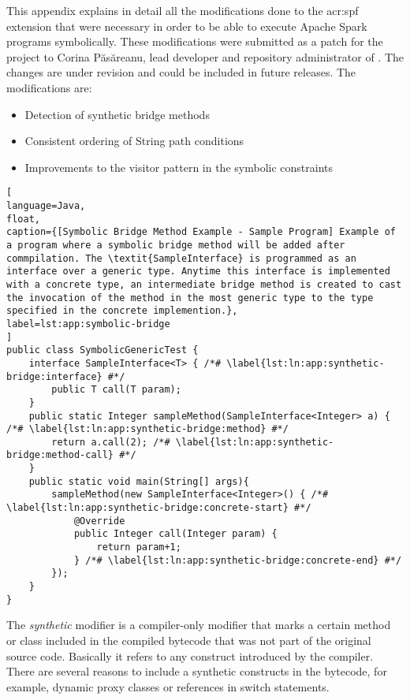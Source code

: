 \label{app:collaborations}

This appendix explains in detail all the modifications done to the \acrfull{acr:spf} extension that were necessary in order to be able to execute Apache Spark programs symbolically. These modifications were submitted as a patch for the \spf{} project to Corina Păsăreanu, lead developer and repository administrator of \spf{}. The changes are under revision and could be included in future releases. The modifications are:

\begin{itemize}
	\item Detection of synthetic bridge methods
	\item Consistent ordering of String path conditions
	\item Improvements to the visitor pattern in the symbolic constraints
\end{itemize}


\begin{lstlisting}[
language=Java,
float,
caption={[Symbolic Bridge Method Example - Sample Program] Example of a program where a symbolic bridge method will be added after commpilation. The \textit{SampleInterface} is programmed as an interface over a generic type. Anytime this interface is implemented with a concrete type, an intermediate bridge method is created to cast the invocation of the method in the most generic type to the type specified in the concrete implemention.},
label=lst:app:symbolic-bridge
]
public class SymbolicGenericTest {
	interface SampleInterface<T> { /*# \label{lst:ln:app:synthetic-bridge:interface} #*/
		public T call(T param); 
	}
	public static Integer sampleMethod(SampleInterface<Integer> a) { /*# \label{lst:ln:app:synthetic-bridge:method} #*/
		return a.call(2); /*# \label{lst:ln:app:synthetic-bridge:method-call} #*/
	}
	public static void main(String[] args){
		sampleMethod(new SampleInterface<Integer>() { /*# \label{lst:ln:app:synthetic-bridge:concrete-start} #*/
			@Override
			public Integer call(Integer param) {				
				return param+1;
			} /*# \label{lst:ln:app:synthetic-bridge:concrete-end} #*/
		});
	}
}
\end{lstlisting}

The \textit{synthetic} modifier is a compiler-only modifier that marks a certain method or class included in the compiled bytecode that was not part of the original source code. Basically it refers to any construct introduced by the compiler. There are several reasons to include a synthetic constructs in the bytecode, for example, dynamic proxy classes or references in switch statements.

